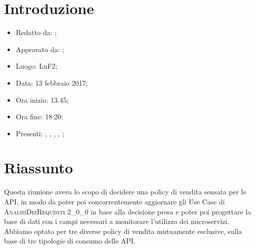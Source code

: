 \section{Introduzione}

	\begin{itemize}
		\item Redatto da: \DS;
		\item Approvato da: \AS;
		\item Luogo: LuF2;
		\item Data: 13 febbraio 2017;
		\item Ora inizio: 13.45;
		\item Ora fine: 18.20;
		\item Presenti: \AN, \DAN, \DS, \AS, \NS \MC;		
	\end{itemize}

\section{Riassunto}
Questa riunione aveva lo scopo di decidere una policy di vendita sensata per le API, in modo da poter poi concorrentemente aggiornare gli Use Case di \textsc{AnalisiDeiRequisiti 2\_0\_0} in base alla decisione presa e poter poi progettare la base di dati con i campi necessari a monitorare l'utilizzo dei microservizi. Abbiamo optato per tre diverse policy di vendita mutuamente esclusive, sulla base di tre tipologie di consumo delle API.


